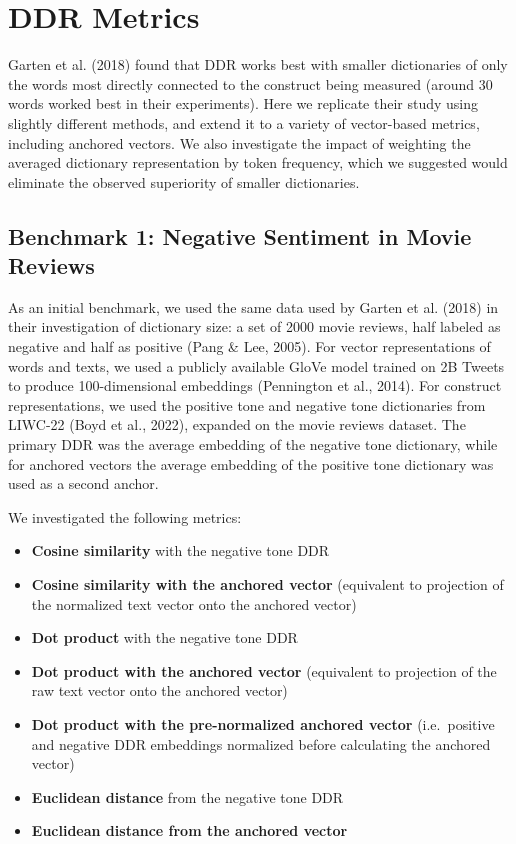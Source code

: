 \documentclass[
  man,
  floatsintext,
  longtable,
  nolmodern,
  notxfonts,
  notimes,
  colorlinks=true,linkcolor=blue,citecolor=blue,urlcolor=blue]{apa7}
\providecommand{\tightlist}{%
  \setlength{\itemsep}{0pt}\setlength{\parskip}{0pt}}
\begin{document}
\section{DDR Metrics}\label{ddr-metrics}

Garten et al. (2018) found that DDR works best with smaller dictionaries
of only the words most directly connected to the construct being
measured (around 30 words worked best in their experiments). Here we
replicate their study using slightly different methods, and extend it to
a variety of vector-based metrics, including anchored vectors. We also
investigate the impact of weighting the averaged dictionary
representation by token frequency, which we suggested would eliminate
the observed superiority of smaller dictionaries.

\subsection{Benchmark 1: Negative Sentiment in Movie
Reviews}\label{benchmark-1-negative-sentiment-in-movie-reviews}

As an initial benchmark, we used the same data used by Garten et al.
(2018) in their investigation of dictionary size: a set of 2000 movie
reviews, half labeled as negative and half as positive (Pang \& Lee,
2005). For vector representations of words and texts, we used a publicly
available GloVe model trained on 2B Tweets to produce 100-dimensional
embeddings (Pennington et al., 2014). For construct representations, we
used the positive tone and negative tone dictionaries from LIWC-22 (Boyd
et al., 2022), expanded on the movie reviews dataset. The primary DDR
was the average embedding of the negative tone dictionary, while for
anchored vectors the average embedding of the positive tone dictionary
was used as a second anchor.

We investigated the following metrics:

\begin{itemize}
\tightlist
\item
  \textbf{Cosine similarity} with the negative tone DDR
\item
  \textbf{Cosine similarity with the anchored vector} (equivalent to
  projection of the normalized text vector onto the anchored vector)
\item
  \textbf{Dot product} with the negative tone DDR
\item
  \textbf{Dot product with the anchored vector} (equivalent to
  projection of the raw text vector onto the anchored vector)
\item
  \textbf{Dot product with the pre-normalized anchored vector}
  (i.e.~positive and negative DDR embeddings normalized before
  calculating the anchored vector)
\item
  \textbf{Euclidean distance} from the negative tone DDR
\item
  \textbf{Euclidean distance from the anchored vector}
\end{itemize}
\end{document}
